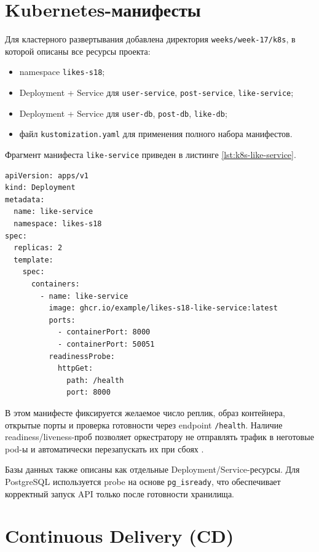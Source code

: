 \section{Kubernetes-манифесты}

Для кластерного развертывания добавлена директория \texttt{weeks/week-17/k8s}, в которой
описаны все ресурсы проекта:
\begin{itemize}
    \item namespace \texttt{likes-s18};
    \item Deployment + Service для \texttt{user-service}, \texttt{post-service}, \texttt{like-service};
    \item Deployment + Service для \texttt{user-db}, \texttt{post-db}, \texttt{like-db};
    \item файл \texttt{kustomization.yaml} для применения полного набора манифестов.
\end{itemize}

Фрагмент манифеста \texttt{like-service} приведен в листинге \ref{lst:k8s-like-service}.

\begin{lstlisting}[caption={Фрагмент Kubernetes-манифеста like-service}, label={lst:k8s-like-service}]
apiVersion: apps/v1
kind: Deployment
metadata:
  name: like-service
  namespace: likes-s18
spec:
  replicas: 2
  template:
    spec:
      containers:
        - name: like-service
          image: ghcr.io/example/likes-s18-like-service:latest
          ports:
            - containerPort: 8000
            - containerPort: 50051
          readinessProbe:
            httpGet:
              path: /health
              port: 8000
\end{lstlisting}

В этом манифесте фиксируется желаемое число реплик, образ контейнера, открытые порты и
проверка готовности через endpoint \texttt{/health}. Наличие readiness/liveness-проб позволяет
оркестратору не отправлять трафик в неготовые pod-ы и автоматически перезапускать их при сбоях
\cite{kubernetes_docs}.

Базы данных также описаны как отдельные Deployment/Service-ресурсы. Для PostgreSQL используется
probe на основе \texttt{pg\_isready}, что обеспечивает корректный запуск API только после
готовности хранилища.

\section{Continuous Delivery (CD)}

